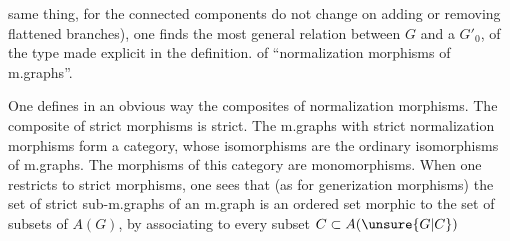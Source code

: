 same thing, for the connected components do not change on adding or removing flattened branches), one finds the most general relation between $G$ and a $G'_0$, of the type made explicit in the definition. of ``normalization morphisms of m.graphs''.

One defines in an obvious way the composites of normalization morphisms. The composite of strict  morphisms is strict. The m.graphs with strict normalization morphisms form a category, whose isomorphisms are the ordinary isomorphisms of m.graphs. The morphisms of this category are monomorphisms. When one restricts to strict  morphisms, one sees that (as for generization morphisms) the set of strict sub-m.graphs of an m.graph  is an ordered set morphic to the set of subsets of $A(G)$, by associating to every subset $C\subset A(\unsure{G|C})$
